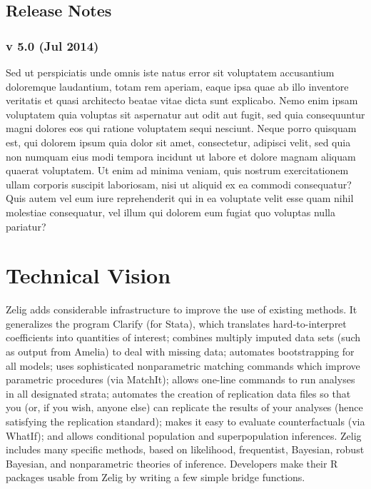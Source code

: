 \documentclass[letterpaper,10pt,english]{sphinxmanual}
\begin{document}
\section{Release Notes}
\label{docs/release_notes:release-notes}\label{docs/release_notes::doc}\label{docs/release_notes:id1}

\subsection{v 5.0 (Jul 2014)}
\label{docs/release_notes:v-5-0-jul-2014}
Sed ut perspiciatis unde omnis iste natus error sit voluptatem accusantium doloremque laudantium, totam rem aperiam, eaque ipsa quae ab illo inventore veritatis et quasi architecto beatae vitae dicta sunt explicabo. Nemo enim ipsam voluptatem quia voluptas sit aspernatur aut odit aut fugit, sed quia consequuntur magni dolores eos qui ratione voluptatem sequi nesciunt. Neque porro quisquam est, qui dolorem ipsum quia dolor sit amet, consectetur, adipisci velit, sed quia non numquam eius modi tempora incidunt ut labore et dolore magnam aliquam quaerat voluptatem. Ut enim ad minima veniam, quis nostrum exercitationem ullam corporis suscipit laboriosam, nisi ut aliquid ex ea commodi consequatur? Quis autem vel eum iure reprehenderit qui in ea voluptate velit esse quam nihil molestiae consequatur, vel illum qui dolorem eum fugiat quo voluptas nulla pariatur?


\chapter{Technical Vision}
\label{index:technicalvision}\label{index:technical-vision}
Zelig adds considerable infrastructure to improve the use of existing
methods. It generalizes the program Clarify (for Stata), which
translates hard-to-interpret coefficients into quantities of interest;
combines multiply imputed data sets (such as output from Amelia) to
deal with missing data; automates bootstrapping for all models; uses
sophisticated nonparametric matching commands which improve parametric
procedures (via MatchIt); allows one-line commands to run analyses in
all designated strata; automates the creation of replication data
files so that you (or, if you wish, anyone else) can replicate the
results of your analyses (hence satisfying the replication standard);
makes it easy to evaluate counterfactuals (via WhatIf); and allows
conditional population and superpopulation inferences. Zelig includes
many specific methods, based on likelihood, frequentist, Bayesian,
robust Bayesian, and nonparametric theories of inference.  Developers
make their R packages usable from Zelig by writing a few simple bridge
functions.
\end{document}
